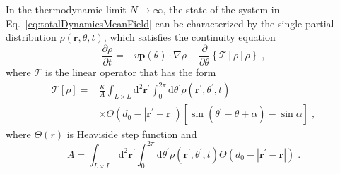 \documentclass{article}
\begin{document}
In the thermodynamic limit $N\to \infty$, the state of the system in Eq.~\eqref{eq:totalDynamicsMeanField} can be characterized by the single-partial distribution $\rho \left( \mathbf{r},\theta ,t \right) $, which satisfies the continuity equation
\begin{equation}
    \frac{\partial \rho}{\partial t}=-v\mathbf{p}\left( \theta \right) \cdot \nabla \rho -\frac{\partial}{\partial \theta}\left\{ \mathcal{T} \left[ \rho \right] \rho \right\} \;,
    \label{eq:globalContinuityEquation}
\end{equation}
where $\mathcal{T}$ is the linear operator that has the form
\begin{equation}
    \begin{aligned}
        \mathcal{T} \left[ \rho \right] =&\frac{K}{A}\int_{L\times L}{\mathrm{d}^2\mathbf{r}^{\prime}\int_0^{2\pi}{\mathrm{d}\theta ^{\prime}\rho \left( \mathbf{r}^{\prime},\theta ^{\prime},t \right)}}\\
        &\times \Theta \left( d_0 - \left| \mathbf{r}^{\prime}-\mathbf{r} \right| \right) \left[ \sin \left( \theta ^{\prime}-\theta +\alpha \right) -\sin \alpha \right]\;,
    \end{aligned}
\end{equation}
where $\Theta(r) $ is Heaviside step function and  
\begin{equation}
    A=\int_{L\times L}{\mathrm{d}^2\mathbf{r}^{\prime}\int_0^{2\pi}{\mathrm{d}\theta ^{\prime}\rho \left( \mathbf{r}^{\prime},\theta ^{\prime},t \right) \Theta \left( d_0 - \left| \mathbf{r}^{\prime}-\mathbf{r} \right|\right)}}\;.
\end{equation}
\end{document}
